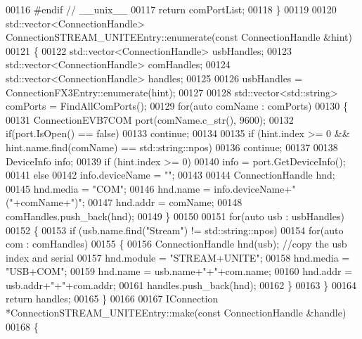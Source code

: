 \begin{DoxyCode}
{00116 \textcolor{preprocessor}{#endif // \_\_unix\_\_}
00117     \textcolor{keywordflow}{return} comPortList;
00118 \}
00119 
00120 std::vector<ConnectionHandle> ConnectionSTREAM_UNITEEntry::enumerate(\textcolor{keyword}{const} 
      ConnectionHandle &hint)
00121 \{
00122     std::vector<ConnectionHandle> usbHandles;
00123     std::vector<ConnectionHandle> comHandles;
00124     std::vector<ConnectionHandle> handles;
00125 
00126     usbHandles = ConnectionFX3Entry::enumerate(hint);
00127 
00128     std::vector<std::string> comPorts = FindAllComPorts();
00129     \textcolor{keywordflow}{for}(\textcolor{keyword}{auto} comName : comPorts)
00130     \{
00131         ConnectionEVB7COM port(comName.c\_str(), 9600);
00132         \textcolor{keywordflow}{if}(port.IsOpen() == \textcolor{keyword}{false})
00133             \textcolor{keywordflow}{continue};
00134 
00135         \textcolor{keywordflow}{if} (hint.index >= 0 && hint.name.find(comName) == std::string::npos)
00136             \textcolor{keywordflow}{continue};
00137 
00138         DeviceInfo info;
00139         \textcolor{keywordflow}{if} (hint.index >= 0)
00140             info = port.GetDeviceInfo();
00141         \textcolor{keywordflow}{else}
00142             info.deviceName = \textcolor{stringliteral}{""};
00143 
00144         ConnectionHandle hnd;
00145         hnd.media = \textcolor{stringliteral}{"COM"};
00146         hnd.name = info.deviceName+\textcolor{stringliteral}{"("}+comName+\textcolor{stringliteral}{")"};
00147         hnd.addr = comName;
00148         comHandles.push\_back(hnd);
00149     \}
00150 
00151     \textcolor{keywordflow}{for}(\textcolor{keyword}{auto} usb : usbHandles)
00152     \{
00153         \textcolor{keywordflow}{if} (usb.name.find(\textcolor{stringliteral}{"Stream"}) != std::string::npos)
00154             \textcolor{keywordflow}{for}(\textcolor{keyword}{auto} com : comHandles)
00155             \{
00156                 ConnectionHandle hnd(usb); \textcolor{comment}{//copy the usb index and serial}
00157                 hnd.module = \textcolor{stringliteral}{"STREAM+UNITE"};
00158                 hnd.media = \textcolor{stringliteral}{"USB+COM"};
00159                 hnd.name = usb.name+\textcolor{stringliteral}{"+"}+com.name;
00160                 hnd.addr = usb.addr+\textcolor{stringliteral}{"+"}+com.addr;
00161                 handles.push\_back(hnd);
00162             \}
00163     \}
00164     \textcolor{keywordflow}{return} handles;
00165 \}
00166 
00167 IConnection *ConnectionSTREAM_UNITEEntry::make(\textcolor{keyword}{const} ConnectionHandle &handle)
00168 \{
}
\end{DoxyCode}
